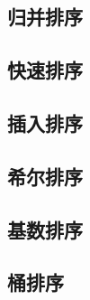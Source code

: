 \subsection{归并排序}
\subsection{快速排序}
\subsection{插入排序}
\subsection{希尔排序}
\subsection{基数排序}
\subsection{桶排序}

